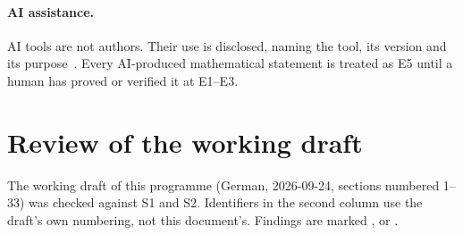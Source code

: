\documentclass[11pt,a4paper]{article}
\begin{document}
\paragraph{AI assistance.} AI tools are not authors. Their use is disclosed, naming the tool, its version and its purpose~\cite{COPE23}. Every AI-produced mathematical statement is treated as E5 until a human has proved or verified it at E1--E3.

\section{Review of the working draft}\label{sec:errata}

The working draft of this programme (German, 2026-09-24, sections numbered 1--33) was checked against S1 and S2. Identifiers in the second column use the draft's own numbering, not this document's. Findings are marked ,  or .
\end{document}
